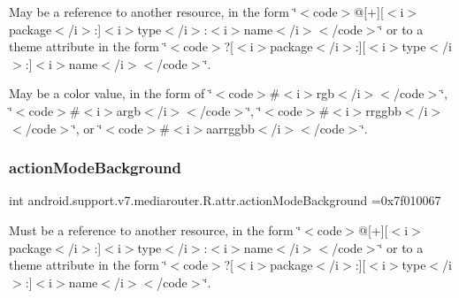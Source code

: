 May be a reference to another resource, in the form \char`\"{}$<$code$>$@\mbox{[}+\mbox{]}\mbox{[}$<$i$>$package$<$/i$>$\+:\mbox{]}$<$i$>$type$<$/i$>$\+:$<$i$>$name$<$/i$>$$<$/code$>$\char`\"{} or to a theme attribute in the form \char`\"{}$<$code$>$?\mbox{[}$<$i$>$package$<$/i$>$\+:\mbox{]}\mbox{[}$<$i$>$type$<$/i$>$\+:\mbox{]}$<$i$>$name$<$/i$>$$<$/code$>$\char`\"{}. 

May be a color value, in the form of \char`\"{}$<$code$>$\#$<$i$>$rgb$<$/i$>$$<$/code$>$\char`\"{}, \char`\"{}$<$code$>$\#$<$i$>$argb$<$/i$>$$<$/code$>$\char`\"{}, \char`\"{}$<$code$>$\#$<$i$>$rrggbb$<$/i$>$$<$/code$>$\char`\"{}, or \char`\"{}$<$code$>$\#$<$i$>$aarrggbb$<$/i$>$$<$/code$>$\char`\"{}. \mbox{\label{classandroid_1_1support_1_1v7_1_1mediarouter_1_1R_1_1attr_a61877989268b116a2bea6fbb830609bc}} 
\subsubsection{\texorpdfstring{action\+Mode\+Background}{actionModeBackground}}
{\footnotesize\ttfamily int android.\+support.\+v7.\+mediarouter.\+R.\+attr.\+action\+Mode\+Background =0x7f010067\hspace{0.3cm}{\ttfamily [static]}}

Must be a reference to another resource, in the form \char`\"{}$<$code$>$@\mbox{[}+\mbox{]}\mbox{[}$<$i$>$package$<$/i$>$\+:\mbox{]}$<$i$>$type$<$/i$>$\+:$<$i$>$name$<$/i$>$$<$/code$>$\char`\"{} or to a theme attribute in the form \char`\"{}$<$code$>$?\mbox{[}$<$i$>$package$<$/i$>$\+:\mbox{]}\mbox{[}$<$i$>$type$<$/i$>$\+:\mbox{]}$<$i$>$name$<$/i$>$$<$/code$>$\char`\"{}. \mbox{\label{classandroid_1_1support_1_1v7_1_1mediarouter_1_1R_1_1attr_ae5c102ae0e21969b71b59eb62c149cb2}} 
